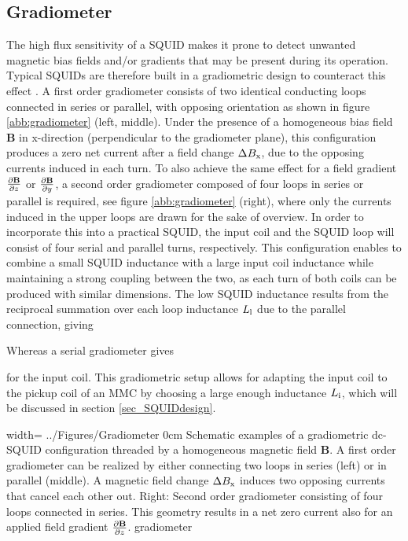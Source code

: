 \subsection{Gradiometer}\label{subsec_gradio}

The high flux sensitivity of a SQUID makes it prone to detect unwanted magnetic bias fields and/or gradients that may be present during its operation. Typical SQUIDs are therefore built in a gradiometric design to counteract this effect \cite{Ketchen1978}. A first order gradiometer consists of two identical conducting loops connected in series or parallel, with opposing orientation as shown in figure \ref{abb:gradiometer} (left, middle). Under the presence of a homogeneous bias field $\textbf{B}$ in x-direction (perpendicular to the gradiometer plane), this configuration produces a zero net current after a field change $\Delta B_{\rm x}$, due to the opposing currents induced in each turn. To also achieve the same effect for a field gradient $\frac{\partial \textbf{B}}{\partial z}$ or $\frac{\partial \textbf{B}}{\partial y}$, a second order gradiometer composed of four loops in series or parallel is required, see figure \ref{abb:gradiometer} (right), where only the currents induced in the upper loops are drawn for the sake of overview. In order to incorporate this into a practical SQUID, the input coil and the SQUID loop will consist of four serial and parallel turns, respectively. This configuration enables to combine a small SQUID inductance with a large input coil inductance while maintaining a strong coupling between the two, as each turn of both coils can be produced with similar dimensions. The low SQUID inductance results from the reciprocal summation over each loop inductance $L_{\rm l}$ due to the parallel connection, giving


Whereas a serial gradiometer gives 


for the input coil. This gradiometric setup allows for adapting the input coil to the pickup coil of an MMC by choosing a large enough inductance $L_{\rm i}$, which will be discussed in section \ref{sec_SQUIDdesign}. 

{width=\textwidth}
{../Figures/Gradiometer}
{0cm}   %
{Schematic examples of a gradiometric dc-SQUID configuration threaded by a homogeneous magnetic field $\textbf{B}$. A first order gradiometer can be realized by either connecting two loops in series (left) or in parallel (middle). A magnetic field change $\Delta B_{\rm x}$ induces two opposing currents that cancel each other out. Right: Second order gradiometer consisting of four loops connected in series. This geometry results in a net zero current also for an applied field gradient $\frac{\partial \textbf{B}}{\partial z}$.}
{gradiometer}
   

